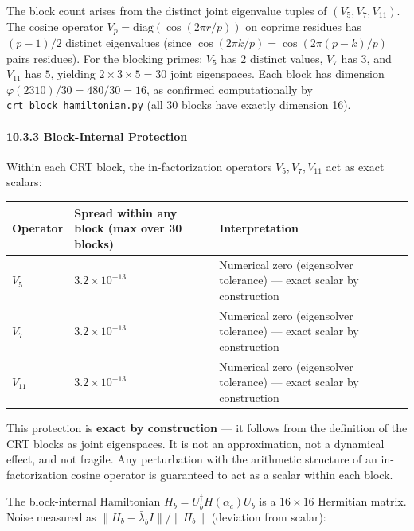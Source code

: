 \documentclass[11pt,letterpaper]{article}
\theoremstyle{definition}
\theoremstyle{remark}
\begin{document}
The block count arises from the distinct joint eigenvalue tuples of $(V_5, V_7, V_{11})$. The cosine operator $V_p = \text{diag}(\cos(2\pi r/p))$ on coprime residues has $(p-1)/2$ distinct eigenvalues (since $\cos(2\pi k/p) = \cos(2\pi(p-k)/p)$ pairs residues). For the blocking primes: $V_5$ has $2$ distinct values, $V_7$ has $3$, and $V_{11}$ has $5$, yielding $2 \times 3 \times 5 = 30$ joint eigenspaces. Each block has dimension $\varphi(2310)/30 = 480/30 = 16$, as confirmed computationally by \texttt{crt\_block\_hamiltonian.py} (all 30 blocks have exactly dimension 16).

\paragraph{10.3.3 Block-Internal Protection}\label{block-internal-protection}

Within each CRT block, the in-factorization operators $V_5, V_7, V_{11}$ act as exact scalars:

\begin{longtable}[]{@{}
  >{\raggedright\arraybackslash}p{}
  >{\raggedright\arraybackslash}p{}
  >{\raggedright\arraybackslash}p{}@{}}
\toprule
Operator & Spread within any block (max over 30 blocks) & Interpretation \\
\midrule
\endhead
\bottomrule
$V_5$ & $3.2 \times 10^{-13}$ & Numerical zero (eigensolver tolerance) --- exact scalar by construction \\
$V_7$ & $3.2 \times 10^{-13}$ & Numerical zero (eigensolver tolerance) --- exact scalar by construction \\
$V_{11}$ & $3.2 \times 10^{-13}$ & Numerical zero (eigensolver tolerance) --- exact scalar by construction \\
\end{longtable}

This protection is \textbf{exact by construction} --- it follows from the definition of the CRT blocks as joint eigenspaces. It is not an approximation, not a dynamical effect, and not fragile. Any perturbation with the arithmetic structure of an in-factorization cosine operator is guaranteed to act as a scalar within each block.

The block-internal Hamiltonian $H_b = U_b^\dagger H(\alpha_c) U_b$ is a $16 \times 16$ Hermitian matrix. Noise measured as $\|H_b - \bar{\lambda}_b I\| / \|H_b\|$ (deviation from scalar):
\end{document}
